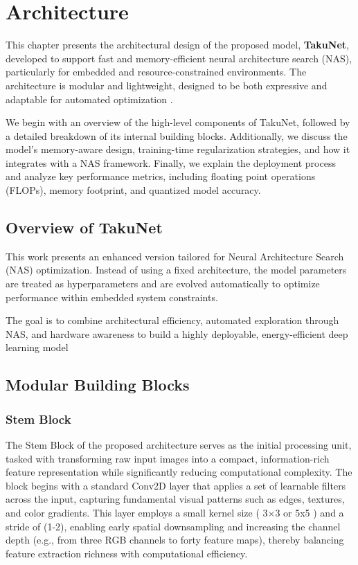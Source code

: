 \chapter{Architecture}

This chapter presents the architectural design of the proposed model, \textbf{TakuNet}, developed to support fast and memory-efficient neural architecture search (NAS), particularly for embedded and resource-constrained environments. The architecture is modular and lightweight, designed to be both expressive and adaptable for automated optimization \cite{TakuNet}.

We begin with an overview of the high-level components of TakuNet, followed by a detailed breakdown of its internal building blocks. Additionally, we discuss the model’s memory-aware design, training-time regularization strategies, and how it integrates with a NAS framework. Finally, we explain the deployment process and analyze key performance metrics, including floating point operations (FLOPs), memory footprint, and quantized model accuracy.


\section{Overview of TakuNet}
 This work presents an enhanced version tailored for Neural Architecture Search (NAS) optimization. Instead of using a fixed architecture, the model parameters are treated as hyperparameters and are evolved automatically to optimize performance within embedded system constraints.


The goal is to combine architectural efficiency, automated exploration through NAS, and hardware awareness to build a highly deployable, energy-efficient deep learning model

\section{Modular Building Blocks}
\subsection{Stem Block}
Τhe Stem Block of the proposed architecture serves as the initial processing unit, tasked with transforming raw input images into a compact, information-rich feature representation while significantly reducing computational complexity. The block begins with a standard Conv2D layer that applies a set of learnable filters across the input, capturing fundamental visual patterns such as edges, textures, and color gradients. This layer employs a small kernel size ( 3×3 or 5x5 ) and a stride of (1-2), enabling early spatial downsampling and increasing the channel depth (e.g., from three RGB channels to forty feature maps), thereby balancing feature extraction richness with computational efficiency.

